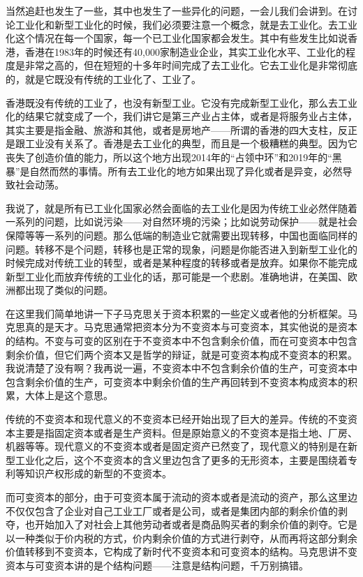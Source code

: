 \documentclass[UTF8, 12pt, a4paper]{ctexrep}
\begin{document}
当然追赶也发生了一些，其中也发生了一些异化的问题，一会儿我们会讲到。在讨论工业化和新型工业化的时候，我们必须要注意一个概念，就是去工业化。去工业化这个情况在每一个国家，每一个已工业化国家都会发生。其中有些发生比如说香港，香港在1983年的时候还有40,000家制造业企业，其实工业化水平、工业化的程度是非常之高的，但在短短的十多年时间完成了去工业化。它去工业化是非常彻底的，就是它既没有传统的工业化了、工业了。

香港既没有传统的工业了，也没有新型工业。它没有完成新型工业化，那么去工业化的结果它就变成了一个，我们讲它是第三产业占主体，或者是将服务业占主体，其实主要是指金融、旅游和其他，或者是房地产——所谓的香港的四大支柱，反正是跟工业没有关系了。香港是去工业化的典型，而且是一个极糟糕的典型。因为它丧失了创造价值的能力，所以这个地方出现2014年的“占领中环”和2019年的“黑暴”是自然而然的事情。所有去工业化的地方如果出现了异化或者是异变，必然导致社会动荡。

我说了，就是所有已工业化国家必然会面临的去工业化是因为传统工业必然伴随着一系列的问题，比如说污染——对自然环境的污染；比如说劳动保护——就是社会保障等等一系列的问题。那么低端的制造业它就需要出现转移，中国也面临同样的问题。转移不是个问题，转移也是正常的现象，问题是你能否进入到新型工业化的时候完成对传统工业的转型，或者是某种程度的转移或者是放弃。如果你不能完成新型工业化而放弃传统的工业化的话，那可能是一个悲剧。准确地讲，在美国、欧洲都出现了类似的问题。

在这里我们简单地讲一下子马克思关于资本积累的一些定义或者他的分析框架。马克思真的是天才。马克思通常把资本分为不变资本与可变资本，其实他说的是资本的结构。不变与可变的区别在于不变资本中不包含剩余价值，而在可变资本中包含剩余价值，但它们两个资本又是哲学的辩证，就是可变资本构成不变资本的积累。我说清楚了没有啊？我再说一遍，不变资本中不包含剩余价值的生产，可变资本中包含剩余价值的生产，可变资本中剩余价值的生产再回转到不变资本构成资本的积累，大体上是这个意思。

传统的不变资本和现代意义的不变资本已经开始出现了巨大的差异。传统的不变资本主要是指固定资本或者是生产资料。但是原始意义的不变资本是指土地、厂房、机器等等。现代意义的不变资本或者是固定资产已然变了，现代意义的特别是在新型工业化之后，这个不变资本的含义里边包含了更多的无形资本，主要是围绕着专利等知识产权形成的新型的不变资本。

而可变资本的部分，由于可变资本属于流动的资本或者是流动的资产，那么这里边不仅仅包含了企业对自己工业工厂或者是公司，或者是集团内部的剩余价值的剥夺，也开始加入了对社会上其他劳动者或者是商品购买者的剩余价值的剥夺。它是以一种类似于价内税的方式，价内剩余价值的方式进行剥夺，从而再将这部分剩余价值转移到不变资本，它构成了新时代不变资本和可变资本的结构。马克思讲不变资本与可变资本讲的是个结构问题——注意是结构问题，千万别搞错。
\end{document}
